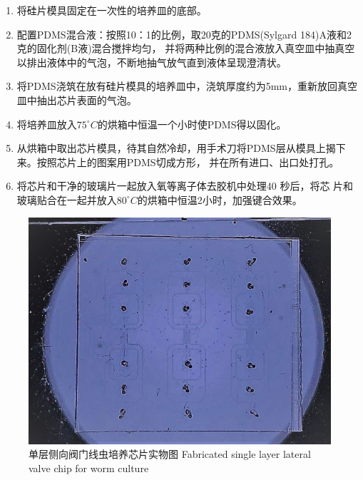 	\begin{enumerate}[label={(\arabic*)},font={\color{black!50!black}\bfseries}]
	\item 将硅片模具固定在一次性的培养皿的底部。
	\item 配置PDMS混合液：按照10：1的比例，取20克的PDMS(Sylgard 184)A液和2克的固化剂(B液)混合搅拌均匀，
	并将两种比例的混合液放入真空皿中抽真空以排出液体中的气泡，不断地抽气放气直到液体呈现澄清状。
	\item 将PDMS浇筑在放有硅片模具的培养皿中，浇筑厚度约为5mm，重新放回真空皿中抽出芯片表面的气泡。
	\item 将培养皿放入$75^\circ C$的烘箱中恒温一个小时使PDMS得以固化。
	\item 从烘箱中取出芯片模具，待其自然冷却，用手术刀将PDMS层从模具上揭下来。按照芯片上的图案用PDMS切成方形，
	并在所有进口、出口处打孔。
	\item 将芯片和干净的玻璃片一起放入氧等离子体去胶机中处理40 秒后，将芯
片和玻璃贴合在一起并放入$80^\circ C$的烘箱中恒温2小时，加强键合效果。
	\end{enumerate}
	\begin{figure}[htbp]
	  \centering
	  \includegraphics[width=12cm]{figure/chap2/fabric-chip1.jpg}
	  \bicaption
		{单层侧向阀门线虫培养芯片实物图}
		{Fabricated single layer lateral valve chip for worm culture}
	  \label{fig:chap2:fabricsinglelayer}
	\end{figure}
